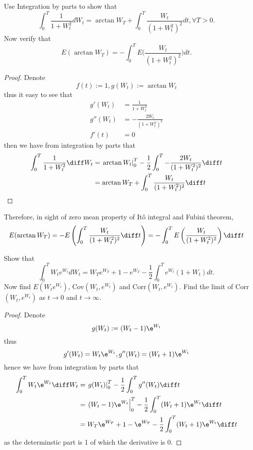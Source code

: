     \problem
    \begin{question}
        Use Integration by parts to show that
        \[\int_0^T\frac{1}{1+W^2_t}dW_t=\arctan W_T+\int_0^T\frac{W_t}{(1+W^2_t)^2}dt,
        \forall T>0.\]
        Now verify that
        \[E(\arctan W_T)=-\int_0^T E\Big(\frac{W_t}{(1+W^2_t)^2}\Big)dt.\]
    \end{question}
    \begin{proof}
        Denote
        \[f(t):=1,g(W_t):=\arctan W_t\]
        thus it easy to see that
        \[\begin{aligned}
            g'(W_t)&=\frac{1}{1+W_t^2}\\
            g''(W_t)&=-\frac{2W_t}{(1+W_t^2)^2}\\
            f'(t)&=0
        \end{aligned}\]
        then we have from integration by parts that
        \[\begin{aligned}
            \int_0^T\frac{1}{1+W_t^2}\diff W_t
            &=\left.\arctan W_t\right|_0^T
            -\frac{1}{2}\int_0^T-\frac{2W_t}{(1+W_t^2)^2}\diff t\\
            &=\arctan W_T+\int_0^T\frac{W_t}{(1+W_t^2)^2}\diff t
        \end{aligned}\]
    \end{proof}

    Therefore, in sight of zero mean property of It\^o integral and
    Fubini theorem,
    \[E(\arctan W_T)=-E\left(\int_0^T\frac{W_t}{(1+W_t^2)^2}\diff t\right)
    =-\int_0^TE\left(\frac{W_t}{(1+W_t^2)^2}\right)\diff t\]

    \problem
    \begin{question}
        Show that
        \[\int_0^T W_te^{W_t}dW_t=W_Te^{W_T}+1-e^{W_T}-\frac{1}{2}\int_0^T e^{W_t}(1+W_t)dt.\]
        Now find $E(W_te^{W_t})$, Cov$(W_t,e^{W_t})$ and Corr$(W_t,e^{W_t})$.  Find the limit
        of Corr$(W_t,e^{W_t})$ as $t\rightarrow 0 $ and $t\rightarrow \infty$.
    \end{question}
    \begin{proof}
        Denote
        \[g(W_t):=(W_t-1)\e^{W_t}\]
        thus
        \[g'(W_t)=W_t\e^{W_t},g''(W_t)=(W_t+1)\e^{W_t}\]
        hence we have from integration by parts that
        \begin{equation}
            \label{eq:WeW}
            \begin{aligned}
            \int_0^TW_t\e^{W_t}\diff W_t&=
            \left.g(W_t)\right|_0^T
            -\frac{1}{2}\int_0^Tg''(W_t)\diff t\\
            &=\left.(W_t-1)\e^{W_t}\right|_0^T
            -\frac{1}{2}\int_0^T(W_t+1)\e^{W_t}\diff t\\
            &=W_T\e^{W_T}+1-\e^{W_T}
            -\frac{1}{2}\int_0^T(W_t+1)\e^{W_t}\diff t\\
            \end{aligned}
        \end{equation}
        as the determinstic part is 1 of which the derivative is 0.
    \end{proof}


